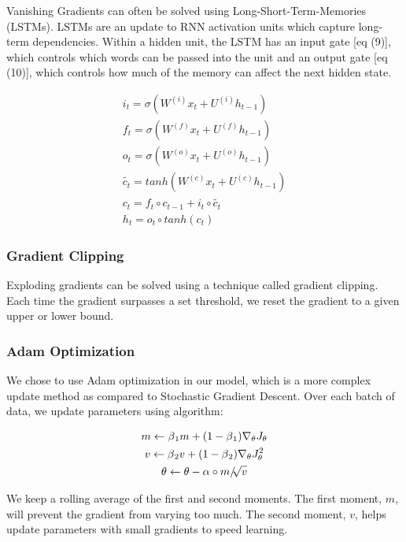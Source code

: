 \documentclass{article} %
\begin{document}
Vanishing Gradients can often be solved using Long-Short-Term-Memories (LSTMs).
LSTMs are an update to RNN activation units which capture long-term
dependencies. Within a hidden unit, the LSTM has an input gate [eq (9)], which
controls which words can be passed into the unit and an output gate [eq (10)],
which controls how much of the memory can affect the next hidden state.

\begin{gather}
i_t = \sigma (W^{(i)} x_t + U^{(i)} h_{t-1}) \\
f_t = \sigma (W^{(f)} x_t + U^{(f)} h_{t-1}) \\
o_t = \sigma (W^{(o)} x_t + U^{(o)} h_{t-1}) \\
\widetilde{c_t} = tanh (W^{(c)} x_t + U^{(c)} h_{t-1}) \\
c_t = f_t \circ c_{t - 1} + i_t \circ \widetilde{c_t} \\
h_t = o_t \circ tanh(c_t)
\end{gather}

\subsubsection*{Gradient Clipping}

Exploding gradients can be solved using a technique called gradient clipping.
Each time the gradient surpasses a set threshold, we reset the gradient to a
given upper or lower bound.

\subsubsection{Adam Optimization}

We chose to use Adam optimization in our model, which is a more complex update
method as compared to Stochastic Gradient Descent. Over each batch of data, we
update parameters using algorithm:

\begin{gather}
m \leftarrow \beta \textsubscript{1} m + 
(1 - \beta \textsubscript{1}) \nabla_{\theta} J_\theta \\
v \leftarrow \beta \textsubscript{2} v + 
(1 - \beta \textsubscript{2}) \nabla_{\theta} J_\theta^2\\
\theta \leftarrow \theta - \alpha \circ m / \sqrt[]{v}
\end{gather}

We keep a rolling average of the first and second moments. The first moment,
$m$, will prevent the gradient from varying too much. The second moment, $v$,
helps update parameters with small gradients to speed learning.
\end{document}
